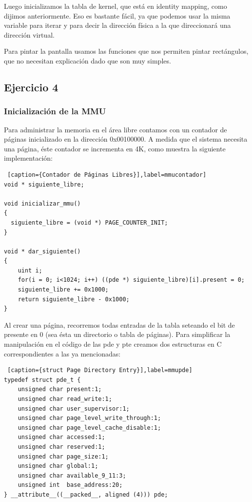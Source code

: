 \documentclass[a4paper]{article}
\begin{document}
\par Luego inicializamos la tabla de kernel, que está en identity mapping, como dijimos anteriormente. Eso es bastante fácil, ya que podemos usar la misma variable para iterar y para decir la dirección física a la que direccionará una dirección virtual.


\par Para pintar la pantalla usamos las funciones que nos permiten pintar rectángulos, que no necesitan explicación dado que son muy simples.

\subsection{Ejercicio 4}

\subsubsection*{Inicialización de la MMU}

\par Para administrar la memoria en el área libre contamos con un contador de páginas inicializado en la dirección 0x00100000. A medida que el sistema necesita una página,  éste contador se incrementa en 4K, como muestra la siguiente implementación:

\begin{lstlisting} [caption={Contador de Páginas Libres}],label=mmucontador] 
void * siguiente_libre;

void inicializar_mmu()
{
  siguiente_libre = (void *) PAGE_COUNTER_INIT;
}

void * dar_siguiente()
{
    uint i;
    for(i = 0; i<1024; i++) ((pde *) siguiente_libre)[i].present = 0;
    siguiente_libre += 0x1000;
    return siguiente_libre - 0x1000;
}
\end{lstlisting}

\par Al crear una página, recorremos todas entradas de la tabla seteando el bit de presente en 0 (sea ésta un directorio o tabla de páginas). Para simplificar la manipulación en el código de las pde y pte creamos dos estructuras en C correspondientes a las ya mencionadas: 

\begin{lstlisting} [caption={struct Page Directory Entry}],label=mmupde] 
typedef struct pde_t {
    unsigned char present:1;
    unsigned char read_write:1;
    unsigned char user_supervisor:1;
    unsigned char page_level_write_through:1;
    unsigned char page_level_cache_disable:1;
    unsigned char accessed:1;
    unsigned char reserved:1;
    unsigned char page_size:1;
    unsigned char global:1;
    unsigned char available_9_11:3;
    unsigned int  base_address:20;
} __attribute__((__packed__, aligned (4))) pde;
\end{lstlisting}
\end{document}
